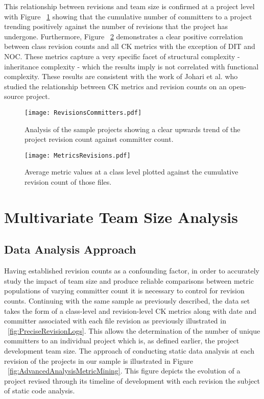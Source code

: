 This relationship between revisions and team size is confirmed at a project level with Figure ~\ref{fig:RevisionsCommitters} showing that the cumulative number of committers to a project trending positively against the number of revisions that the project has undergone. Furthermore, Figure ~\ref{fig:MetricsRevisions} demonstrates a clear positive correlation between class revision counts and all CK metrics with the exception of DIT and NOC. These metrics capture a very specific facet of structural complexity - inheritance complexity - which the results imply is not correlated with functional complexity. These results are consistent with the work of Johari et al. \citep{johari2012validation} who studied the relationship between CK metrics and revision counts on an open-source project. 

\begin{figure}[htbp!] 
\centering    
\texttt{[image: RevisionsCommitters.pdf]}
\caption{Analysis of the sample projects showing a clear upwards trend of the project revision count against committer count.}
\label{fig:RevisionsCommitters}
\end{figure}

\begin{figure}[htbp!] 
\centering    
\texttt{[image: MetricsRevisions.pdf]}
\caption{Average metric values at a class level plotted against the cumulative revision count of those files.}
\label{fig:MetricsRevisions}
\end{figure}

\section{Multivariate Team Size Analysis} %

\subsection{Data Analysis Approach}
Having established revision counts as a confounding factor, in order to accurately study the impact of team size and produce reliable comparisons between metric populations of varying committer count it is necessary to control for revision counts. Continuing with the same sample as previously described, the data set takes the form of a class-level and revision-level CK metrics along with date and committer associated with each file revision as previously illustrated in ~\ref{fig:PreciseRevisionLogs}. This allows the determination of the number of unique committers to an individual project which is, as defined earlier, the project development team size. The approach of conducting static data analysis at each revision of the projects in our sample is illustrated in Figure ~\ref{fig:AdvancedAnalysisMetricMining}. This figure depicts the evolution of a project revised through its timeline of development with each revision the subject of static code analysis. 

